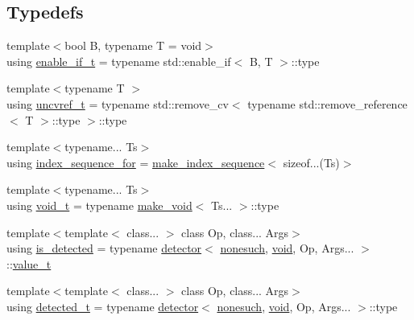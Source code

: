 \subsection*{Typedefs}
\begin{DoxyCompactItemize}
\item 
{\footnotesize template$<$bool B, typename T  = void$>$ }\\using \hyperlink{namespacenlohmann_1_1detail_a02bcbc878bee413f25b985ada771aa9c}{enable\+\_\+if\+\_\+t} = typename std\+::enable\+\_\+if$<$ B, T $>$\+::type
\item 
{\footnotesize template$<$typename T $>$ }\\using \hyperlink{namespacenlohmann_1_1detail_a53a082eedad9f4729fcd8fed552a21f7}{uncvref\+\_\+t} = typename std\+::remove\+\_\+cv$<$ typename std\+::remove\+\_\+reference$<$ T $>$\+::type $>$\+::type
\item 
{\footnotesize template$<$typename... Ts$>$ }\\using \hyperlink{namespacenlohmann_1_1detail_a24800493c6ec02ce033dcbb47b7fd28e}{index\+\_\+sequence\+\_\+for} = \hyperlink{structnlohmann_1_1detail_1_1make__index__sequence}{make\+\_\+index\+\_\+sequence}$<$ sizeof...(Ts)$>$
\item 
{\footnotesize template$<$typename... Ts$>$ }\\using \hyperlink{namespacenlohmann_1_1detail_a92a167c49c6697b6ffe4f79492c705e5}{void\+\_\+t} = typename \hyperlink{structnlohmann_1_1detail_1_1make__void}{make\+\_\+void}$<$ Ts... $>$\+::type
\item 
{\footnotesize template$<$template$<$ class... $>$ class Op, class... Args$>$ }\\using \hyperlink{namespacenlohmann_1_1detail_a9135fcf616d6ac6e231a86e0a055ac44}{is\+\_\+detected} = typename \hyperlink{structnlohmann_1_1detail_1_1detector}{detector}$<$ \hyperlink{structnlohmann_1_1detail_1_1nonesuch}{nonesuch}, \hyperlink{namespacenlohmann_1_1detail_a59fca69799f6b9e366710cb9043aa77d}{void}, Op, Args... $>$\+::\hyperlink{namespacenlohmann_1_1detail_a1ed8fc6239da25abcaf681d30ace4985}{value\+\_\+t}
\item 
{\footnotesize template$<$template$<$ class... $>$ class Op, class... Args$>$ }\\using \hyperlink{namespacenlohmann_1_1detail_a37e97a32d0b94ce5f745427e4e40204d}{detected\+\_\+t} = typename \hyperlink{structnlohmann_1_1detail_1_1detector}{detector}$<$ \hyperlink{structnlohmann_1_1detail_1_1nonesuch}{nonesuch}, \hyperlink{namespacenlohmann_1_1detail_a59fca69799f6b9e366710cb9043aa77d}{void}, Op, Args... $>$\+::type

\end{DoxyCompactItemize}
